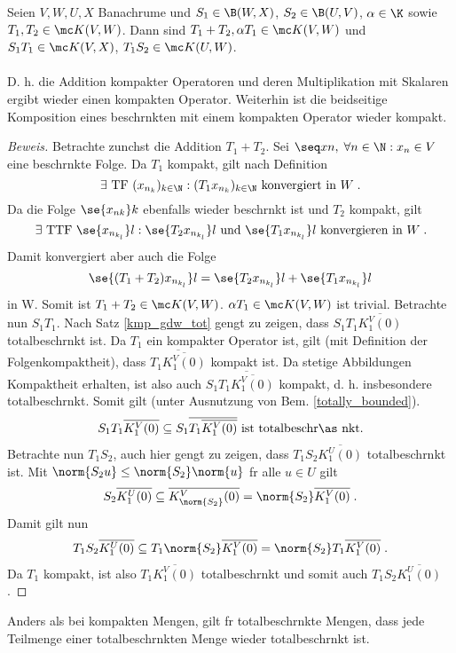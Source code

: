 \begin{theorem}
	\label{composition_compact_bounded}
	Seien \(V,W, U, X\) Banachr\as ume und  \(S_1\in \B(W,X)\), \(S_2\in \B(U,V)\), \;\(\alpha \in \K\) sowie \(T_1, T_2\in \mc K(V,W)\). Dann sind \(T_1 + T_2, \alpha T_1 \in \mc K(V,W)\) und \(S_1 T_1\in \mc K(V,X)\), \(T_1S_2\in \mc K(U,W)\). \\ \\  D. h. die Addition kompakter Operatoren und deren Multiplikation mit Skalaren ergibt wieder einen kompakten Operator. Weiterhin ist die beidseitige Komposition eines beschr\as nkten mit einem kompakten Operator wieder kompakt.
\end{theorem}
\begin{proof}[Beweis]
	Betrachte zun\as chst die Addition \(T_1 + T_2\). Sei \(\seq xn,\; \forall n\in\N: x_n \in V\) eine beschr\as nkte Folge. Da $T_1$ kompakt, gilt nach Definition
	\[\exists \text{ TF } (x_{n_k})_{k\in\N}: (T_1 x_{n_k})_{k\in\N} \text{ konvergiert in } W\;.\]
	Da die Folge \(\se {x_{nk}}k\) ebenfalls wieder beschr\as nkt ist und $T_2$ kompakt, gilt
	\[\exists\text{ TTF } \se {x_{n_{k_l}}}l:  \se { T_2 x_{n_{k_l}}}l \text{ und } \se {T_ 1x_{n_{k_l}}}l \text{ konvergieren in }W \;.\]
	Damit konvergiert aber auch die Folge
	\[\se {(T_1 + T_2) x_{n_{k_l}}}l = \se { T_2 x_{n_{k_l}}}l + \se {T_ 1x_{n_{k_l}}}l \]
	in W. Somit ist \(T_1 + T_2 \in \mc K(V,W)\). \(\alpha T_1 \in \mc K(V,W)\) ist trivial. Betrachte nun \(S_1 T_1\). Nach Satz \ref{kmp_gdw_tot}  gen\us gt zu zeigen, dass \(S_1 T_1 \overline{K_1^V(0)}\) totalbeschr\as nkt ist. Da $T_1$ ein kompakter Operator ist, gilt (mit Definition der Folgenkompaktheit), dass \(\overline{T_1\overline{K_1^V(0)}}\) kompakt ist. Da stetige Abbildungen Kompaktheit erhalten, ist also auch \(S_1 \overline{T_1\overline{K_1^V(0)}}\) kompakt, d. h. insbesondere totalbeschr\as nkt. Somit gilt (unter Ausnutzung von Bem. \ref{totally_bounded}).
	\[S_1 T_1 \overline{K_1^V(0)} \subseteq S_1\overline{T_1\overline{K_1^V(0)}} \text{ ist totalbeschr\as nkt.}\]
	Betrachte nun \(T_1S_2\), auch hier gen\us gt zu zeigen, dass \(T_1S_2 \overline{K_1^U(0)}\) totalbeschr\as nkt ist. Mit \(\norm {S_2 u} \leq \norm{S_2}\norm{u}\) f\us r alle \(u\in U\) gilt
	\[S_2 \overline{K_1^U(0)} \subseteq \overline{K_{\norm{S_2}}^V(0)} = \norm{S_2} \overline{K_1^V(0)}\;.\]
	Damit gilt nun 
	\[T_1S_2 \overline{K_1^U(0)} \subseteq T_1\norm{S_2} \overline{K_1^V(0)} = \norm{S_2} T_1\overline{K_1^V(0)}\;.\]
	Da $T_1$ kompakt, ist also \(T_1 \overline{K_1^V(0)}\) totalbeschr\as nkt und somit auch \(T_1S_2\overline{K_1^U(0)}\).
\end{proof}
\begin{rem}
	\label{totally_bounded}
	Anders als bei kompakten Mengen, gilt f\us r totalbeschr\as nkte Mengen, dass jede Teilmenge einer totalbeschr\as nkten Menge wieder totalbeschr\as nkt ist.
\end{rem}


